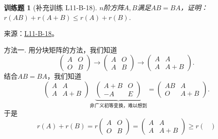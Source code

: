 \documentclass[UTF8,12pt,a4paper,fontset=fandol]{ctexart}
\newtheorem{exercise}{训练题}[section]
\begin{document}
\begin{exercise}[补充训练 L11-B-18]\label{prob:L11-B-18}
$n$阶方阵$A,B$满足$AB=BA$，证明：$r(AB)+r(A+B) \leqslant r(A)+r(B)$.
\end{exercise}
\noindent 来源：\href{https://github.com/yhwu-is/Linear-Algebra-Left-Undone/blob/new/%E8%AE%B2%E4%B9%89/%E4%B8%93%E9%A2%98/11%20%E6%9C%9D%E8%8A%B1%E5%A4%95%E6%8B%BE.tex}{L11-B-18}。
\begin{solve}
方法一. 用分块矩阵的方法，我们知道
          \[ \begin{pmatrix}
                  A & O \\
                  O & B
              \end{pmatrix}
              \rightarrow
              \begin{pmatrix}
                  A & O \\
                  A & B
              \end{pmatrix}
              \rightarrow
              \begin{pmatrix}
                  A & A   \\
                  A & A+B
              \end{pmatrix}. \]
          结合$AB=BA$，我们知道
          \[ \begin{pmatrix}
                  A & A   \\
                  A & A+B
              \end{pmatrix}
              \underbrace{
                  \begin{pmatrix}
                      A+B & O \\
                      -A  & E
                  \end{pmatrix}
              }_{\text{非广义初等变换，难以想到}}
              =
              \begin{pmatrix}
                  AB & A   \\
                  O  & A+B
              \end{pmatrix}. \]
          于是
          \[ r(A)+r(B)=r
              \begin{pmatrix}
                  A & O \\
                  O & B
              \end{pmatrix}=
              \begin{pmatrix}
                  A & A   \\
                  A & A+B
              \end{pmatrix}\geqslant r
              \begin{pmatrix}

\end{pmatrix}\]
\end{solve}
\end{document}
